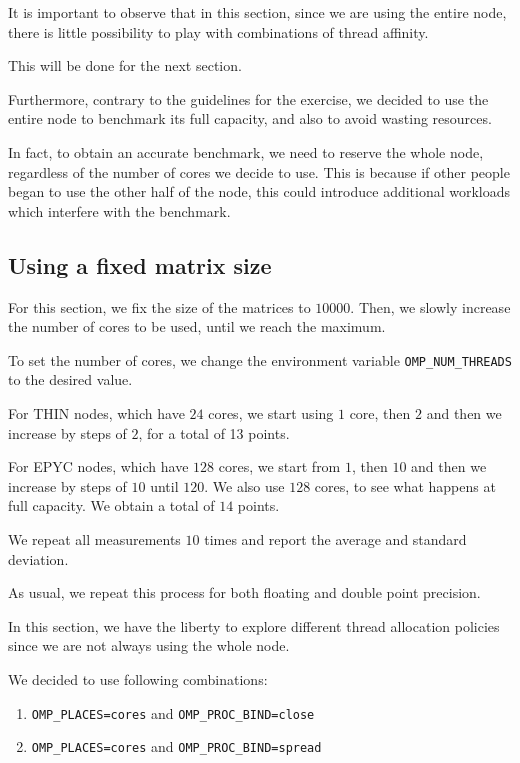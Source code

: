\documentclass{report}
\begin{document}
It is important to observe that in this section, since we are using the entire 
node, there is little possibility to play with combinations of thread affinity.

This will be done for the next section.

Furthermore, contrary to the guidelines for the exercise, we decided to use the 
entire node to benchmark its full capacity, and also to avoid wasting 
resources. 

In fact, to obtain an accurate benchmark, we need to reserve the whole node, 
regardless of the number of cores we decide to use. This is because if other 
people began to use the other half of the node, this could introduce additional 
workloads which interfere with the benchmark. 

\subsection{Using a fixed matrix size}

For this section, we fix the size of the matrices to $10000$. Then, we slowly 
increase the number of cores to be used, until we reach the maximum. 

To set the number of cores, we change the environment variable 
\texttt{OMP\_NUM\_THREADS} to the desired value.

For THIN nodes, which have $24$ cores, we start using $1$ core, then $2$ and 
then we increase by steps of $2$, for a total of 13 points.

For EPYC nodes, which have $128$ cores, we start from $1$, then $10$ and then 
we increase by steps of $10$ until $120$. We also use $128$ cores, to see what 
happens at full capacity. We obtain a total of $14$ points.

We repeat all measurements $10$ times and report the average and standard 
deviation.

As usual, we repeat this process for both floating and double point precision.

In this section, we have the liberty to explore different thread allocation 
policies since we are not always using the whole node. 

We decided to use following combinations:
\begin{enumerate}
    \item \texttt{OMP\_PLACES=cores} and \texttt{OMP\_PROC\_BIND=close} 
    \item \texttt{OMP\_PLACES=cores} and \texttt{OMP\_PROC\_BIND=spread} 
\end{enumerate}
\end{document}
